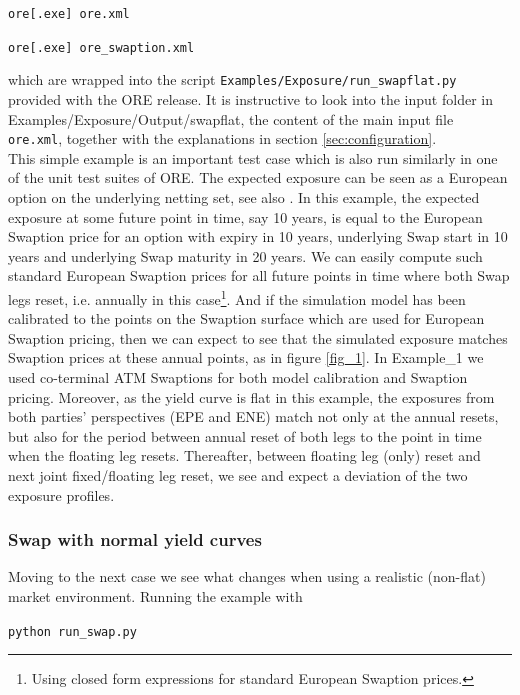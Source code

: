 \medskip
\centerline{\tt ore[.exe] ore.xml}

\centerline{\tt ore[.exe] ore\_swaption.xml}
\medskip

which are wrapped into the script {\tt Examples/Exposure/run\_swapflat.py} provided with the ORE release.
It is instructive to look into the input folder in Examples/Exposure/Output/swapflat, the content of the main input file {\tt
  ore.xml}, together with the explanations in section \ref{sec:configuration}. \\

This simple example is an important test case which is also run similarly in one of the unit test suites of ORE. The
expected exposure can be seen as a European option on the underlying netting set, see also \cite{methods}.
In this example, the expected exposure at some future point in time, say 10 years, is equal to
the European Swaption price for an option with expiry in 10 years, underlying Swap start in 10 years and underlying Swap
maturity in 20 years. We can easily compute such standard European Swaption prices for all future points in time where
both Swap legs reset, i.e. annually in this case\footnote{Using closed form expressions for standard European Swaption
  prices.}. And if the simulation model has been calibrated to the points on the Swaption surface which are used for
European Swaption pricing, then we can expect to see that the simulated exposure matches Swaption prices at these annual
points, as in figure \ref{fig_1}.  In Example\_1 we used co-terminal ATM Swaptions for both model calibration and
Swaption pricing. Moreover, as the yield curve is flat in this example, the exposures from both parties'
perspectives (EPE and ENE) match not only at the annual resets, but also for the period between annual reset of both
legs to the point in time when the floating leg resets. Thereafter, between floating leg (only) reset and next joint
fixed/floating leg reset, we see and expect a deviation of the two exposure profiles.

\subsubsection{Swap with normal yield curves}\label{example:exposure_swap}

Moving to the next case we see what changes when using a realistic (non-flat) market
environment. Running the example with

\medskip
\centerline{\tt python run\_swap.py }
\medskip

